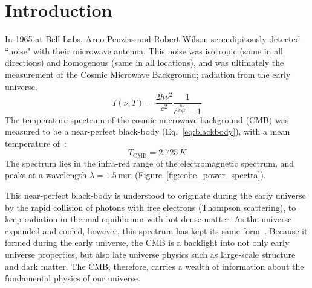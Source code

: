 
\chapter{Introduction} %

\label{ch:intro} %


\newcommand{\keyword}[1]{\textbf{#1}}
\newcommand{\tabhead}[1]{\textbf{#1}}
\newcommand{\code}[1]{\texttt{#1}}
\newcommand{\file}[1]{\texttt{\bfseries#1}}
\newcommand{\option}[1]{\texttt{\itshape#1}}

In 1965 at Bell Labs, Arno Penzias and Robert Wilson serendipitously detected ``noise" with their microwave antenna.  This noise was isotropic (same in all directions) and homogenous (same in all locations), and was ultimately the measurement of the Cosmic Microwave Background; radiation from the early universe.
\begin{equation}
    I(\nu,T) = \frac{2h\nu^2}{c^2}\frac{1}{e^{\frac{h\nu}{k_B T}} -1}
    \label{eq:blackbody}
\end{equation}
The temperature spectrum of the cosmic microwave background (CMB) was measured to be a near-perfect black-body (Eq.~\ref{eq:blackbody}), with a mean temperature of~\cite{burke_graham-smith_wilkinson_2019}:
\begin{equation}
    T_{\text{CMB}} = 2.725\,K
\end{equation}
The spectrum lies in the infra-red range of the electromagnetic spectrum, and peaks at a wavelength $\lambda = 1.5\,\text{mm}$ (Figure~\ref{fig:cobe_power_spectra}). 

This near-perfect black-body is understood to originate during the early universe by the rapid collision of photons with free electrons (Thompson scattering), to keep radiation in thermal equilibrium with hot dense matter.  As the universe expanded and cooled, however, this spectrum has kept its same form~\cite{weinberg_cosmo}.  Because it formed during the early universe, the CMB is a backlight into not only early universe properties, but also late universe physics such as large-scale structure and dark matter.  The CMB, therefore, carries a wealth of information about the fundamental physics of our universe.

